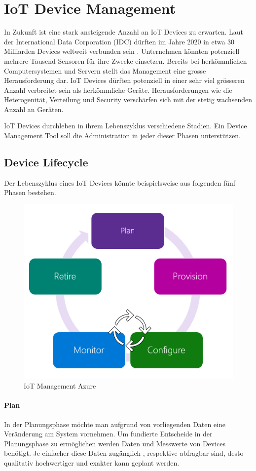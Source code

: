 \chapter{IoT Device Management}
\label{sec:devmgmt}
In Zukunft ist eine stark ansteigende Anzahl an IoT Devices zu erwarten. Laut der International Data Corporation (IDC) dürften im Jahre 2020 in etwa 30 Milliarden Devices weltweit verbunden sein \cite{IDC15}. Unternehmen könnten potenziell mehrere Tausend Sensoren für ihre Zwecke einsetzen. Bereits bei herkömmlichen Computersystemen und Servern stellt das Management eine grosse Herausforderung dar. IoT Devices dürften potenziell in einer sehr viel grösseren Anzahl verbreitet sein als herkömmliche Geräte. Herausforderungen wie die Heterogenität, Verteilung und Security verschärfen sich mit der stetig wachsenden Anzahl an Geräten. 

IoT Devices durchleben in ihrem Lebenszyklus verschiedene Stadien. Ein Device Management Tool soll die Administration in jeder dieser Phasen unterstützen.
\section{Device Lifecycle}
Der Lebenszyklus eines IoT Devices könnte beispielsweise aus folgenden fünf Phasen bestehen.
\begin{figure}[H]
\centering
\includegraphics[scale=0.5]{../02_Analyse/images/hubdevmgmt-azure.png}
\caption{IoT Management Azure \cite{IoTMgmtAzure}}
\end{figure}
\subsubsection{Plan}
In der Planungsphase möchte man aufgrund von vorliegenden Daten eine Veränderung am System vornehmen. Um fundierte Entscheide in der Planungsphase zu ermöglichen werden Daten und Messwerte von Devices benötigt. Je einfacher diese Daten zugänglich-, respektive abfragbar sind, desto qualitativ hochwertiger und exakter kann geplant werden.
